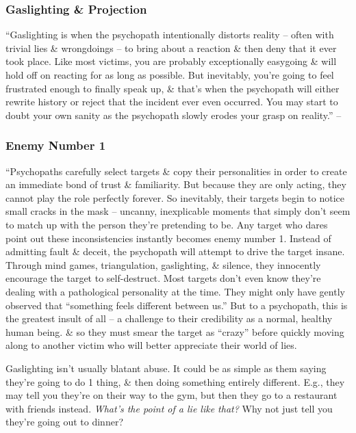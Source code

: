 \documentclass{article}
\numberwithin{equation}{section}
\begin{document}
\subsubsection{Gaslighting \& Projection}
``Gaslighting is when the psychopath intentionally distorts reality -- often with trivial lies \& wrongdoings -- to bring about a reaction \& then deny that it ever took place. Like most victims, you are probably exceptionally easygoing \& will hold off on reacting for as long as possible. But inevitably, you're going to feel frustrated enough to finally speak up, \& that's when the psychopath will either rewrite history or reject that the incident ever even occurred. You may start to doubt your own sanity as the psychopath slowly erodes your grasp on reality.'' -- \cite[p. 46]{MacKenzie2015}

\subsubsection{Enemy Number 1}
``Psychopaths carefully select targets \& copy their personalities in order to create an immediate bond of trust \& familiarity. But because they are only acting, they cannot play the role perfectly forever. So inevitably, their targets begin to notice small cracks in the mask -- uncanny, inexplicable moments that simply don't seem to match up with the person they're pretending to be. Any target who dares point out these inconsistencies instantly becomes enemy number 1. Instead of admitting fault \& deceit, the psychopath will attempt to drive the target insane. Through mind games, triangulation, gaslighting, \& silence, they innocently encourage the target to self-destruct. Most targets don't even know they're dealing with a pathological personality at the time. They might only have gently observed that ``something feels different between us.'' But to a psychopath, this is the greatest insult of all -- a challenge to their credibility as a normal, healthy human being. \& so they must smear the target as ``crazy'' before quickly moving along to another victim who will better appreciate their world of lies.

Gaslighting isn't usually blatant abuse. It could be as simple as them saying they're going to do 1 thing, \& then doing something entirely different. E.g., they may tell you they're on their way to the gym, but then they go to a restaurant with friends instead. \textit{What's the point of a lie like that?} Why not just tell you they're going out to dinner?
\end{document}
